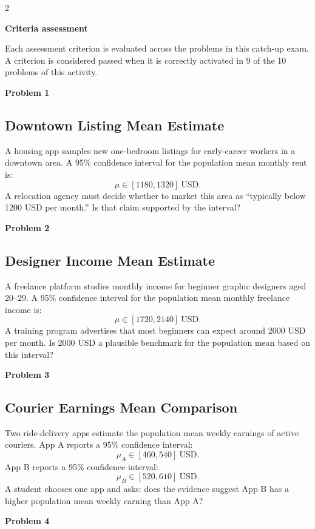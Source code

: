 \documentclass[12pt]{article}
\newcommand{\SubsectionBox}[1]{%
	\noindent\colorbox{gray!30}{\parbox{\linewidth}{\textbf{#1}}}\par\vspace{0.35cm}%
}
\begin{document}
	\begin{multicols}{2}
		\SubsectionBox{Criteria assessment}\vspace{-0.25cm}
		Each assessment criterion is evaluated across the problems in this catch-up exam. A criterion is considered passed when it is correctly activated in 9 of the 10 problems of this activity.
		
		\vspace{0.25cm}
		\SubsectionBox{Problem 1}
		\subsection*{Downtown Listing Mean Estimate}
		A housing app samples new one-bedroom listings for early-career workers in a downtown area.
		A 95\% confidence interval for the population mean monthly rent is:
		\[
		\mu \in [1180, 1320]\ \text{USD}.
		\]
		A relocation agency must decide whether to market this area as ``typically below 1200 USD per month.''
		Is that claim supported by the interval?
		
		\vspace{0.5cm}
		\SubsectionBox{Problem 2}
		\subsection*{Designer Income Mean Estimate}
		A freelance platform studies monthly income for beginner graphic designers aged 20--29.
		A 95\% confidence interval for the population mean monthly freelance income is:
		\[
		\mu \in [1720, 2140]\ \text{USD}.
		\]
		A training program advertises that most beginners can expect around 2000 USD per month.
		Is 2000 USD a plausible benchmark for the population mean based on this interval?
		
		\vspace{0.5cm}
		\SubsectionBox{Problem 3}
		\subsection*{Courier Earnings Mean Comparison}
		Two ride-delivery apps estimate the population mean weekly earnings of active couriers.
		App A reports a 95\% confidence interval:
		\[
		\mu_A \in [460, 540]\ \text{USD}.
		\]
		App B reports a 95\% confidence interval:
		\[
		\mu_B \in [520, 610]\ \text{USD}.
		\]
		A student chooses one app and asks: does the evidence suggest App B has a higher population mean weekly earning than App A?
		
		\vspace{0.5cm}
		\SubsectionBox{Problem 4}

\end{multicols}
\end{document}
